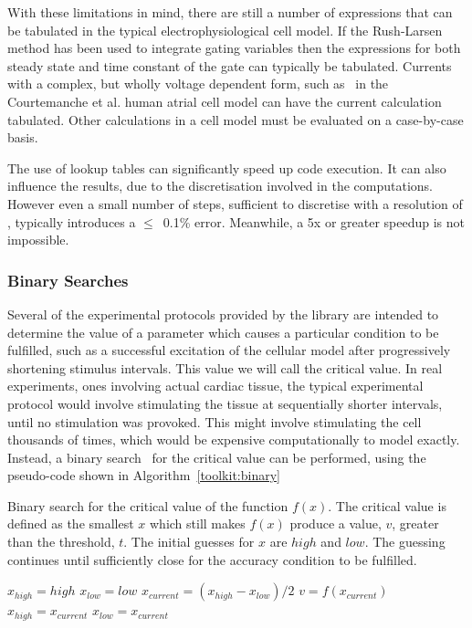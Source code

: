 With these limitations in mind, there are still a number of expressions that can
be tabulated in the typical electrophysiological cell model.
If the Rush-Larsen method has been used to integrate gating variables then the
expressions for both steady state and time constant of the gate can typically be
tabulated.
Currents with a complex, but wholly voltage dependent form, such as \ in
the Courtemanche et al. human atrial cell model can have the current calculation
tabulated.
Other calculations in a cell model must be evaluated on a case-by-case basis.

The use of lookup tables can significantly speed up code execution.
It can also influence the results, due to the discretisation involved in the
computations.
However even a small number of steps, sufficient to discretise with a
resolution of , typically introduces a $\leq$~0.1\% error.
Meanwhile, a 5x or greater speedup is not impossible.

\subsubsection{Binary Searches}

Several of the experimental protocols provided by the library are intended to
determine the value of a parameter which causes a particular condition to be
fulfilled, such as a successful excitation of the cellular model after
progressively shortening stimulus intervals.  This value we will call the
critical value. In real experiments, ones involving actual cardiac tissue, the
typical experimental protocol would involve stimulating the tissue at
sequentially shorter intervals, until no stimulation was provoked.  This might
involve stimulating the cell thousands of times, which would be expensive
computationally to model exactly.  Instead, a binary search~\cite{IntroAlgo} for the critical
value can be performed, using the pseudo-code shown in Algorithm~\ref{toolkit:binary}

\begin{algorithm}
\caption{
Binary search for the critical value of the function $f(x)$.
The critical value is defined as the smallest $x$ which still makes $f(x)$
produce a value, $v$, greater than the threshold, $t$.
The initial guesses for $x$ are $high$ and $low$.
The guessing continues until sufficiently close for the accuracy condition to be
fulfilled.
}
\label{toolkit:binary}
\begin{algorithmic}
\STATE $x_{high} = high$
\STATE $x_{low} = low$
\REPEAT
\STATE $x_{current} = \left(x_{high} - x_{low}\right) / 2$
\STATE $v = f\!\left(x_{current}\right)$
\STATE $x_{high} = x_{current}$
\ELSE
\STATE $x_{low} = x_{current}$
\ENDIF
{}
\end{algorithmic}
\end{algorithm}

